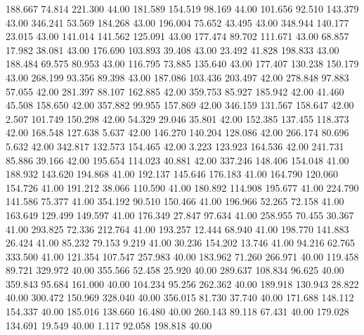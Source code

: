  188.667   74.814  221.300        44.00
 181.589  154.519   98.169        44.00
 101.656   92.510  143.379        43.00
 346.241   53.569  184.268        43.00
 196.004   75.652   43.495        43.00
 348.944  140.177   23.015        43.00
 141.014  141.562  125.091        43.00
 177.474   89.702  111.671        43.00
  68.857   17.982   38.081        43.00
 176.690  103.893   39.408        43.00
  23.492   41.828  198.833        43.00
 188.484   69.575   80.953        43.00
 116.795   73.885  135.640        43.00
 177.407  130.238  150.179        43.00
 268.199   93.356   89.398        43.00
 187.086  103.436  203.497        42.00
 278.848   97.883   57.055        42.00
 281.397   88.107  162.885        42.00
 359.753   85.927  185.942        42.00
  41.460   45.508  158.650        42.00
 357.882   99.955  157.869        42.00
 346.159  131.567  158.647        42.00
   2.507  101.749  150.298        42.00
  54.329   29.046   35.801        42.00
 152.385  137.455  118.373        42.00
 168.548  127.638    5.637        42.00
 146.270  140.204  128.086        42.00
 266.174   80.696    5.632        42.00
 342.817  132.573  154.465        42.00
   3.223  123.923  164.536        42.00
 241.731   85.886   39.166        42.00
 195.654  114.023   40.881        42.00
 337.246  148.406  154.048        41.00
 188.932  143.620  194.868        41.00
 192.137  145.646  176.183        41.00
 164.790  120.060  154.726        41.00
 191.212   38.066  110.590        41.00
 180.892  114.908  195.677        41.00
 224.790  141.586   75.377        41.00
 354.192   90.510  150.466        41.00
 196.966   52.265   72.158        41.00
 163.649  129.499  149.597        41.00
 176.349   27.847   97.634        41.00
 258.955   70.455   30.367        41.00
 293.825   72.336  212.764        41.00
 193.257   12.444   68.940        41.00
 198.770  141.883   26.424        41.00
  85.232   79.153    9.219        41.00
  30.236  154.202   13.746        41.00
  94.216   62.765  333.500        41.00
 121.354  107.547  257.983        40.00
 183.962   71.260  266.971        40.00
 119.458   89.721  329.972        40.00
 355.566   52.458   25.920        40.00
 289.637  108.834   96.625        40.00
 359.843   95.684  161.000        40.00
 104.234   95.256  262.362        40.00
 189.918  130.943   28.822        40.00
 300.472  150.969  328.040        40.00
 356.015   81.730   37.740        40.00
 171.688  148.112  154.337        40.00
 185.016  138.660   16.480        40.00
 260.143   89.118   67.431        40.00
 179.028  134.691   19.549        40.00
   1.117   92.058  198.818        40.00
